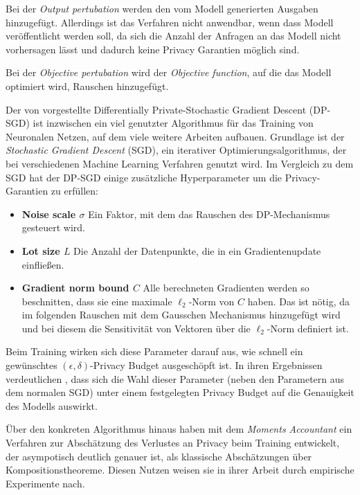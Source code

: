 Bei der \textit{Output pertubation} werden den vom Modell generierten Ausgaben hinzugefügt. Allerdings ist das Verfahren nicht anwendbar, wenn dass Modell veröffentlicht werden soll, da sich die Anzahl der Anfragen an das Modell nicht vorhersagen lässt und dadurch keine Privacy Garantien möglich sind.

Bei der \textit{Objective pertubation} wird der \textit{Objective function}, auf die das Modell optimiert wird, Rauschen hinzugefügt.

Der von \textcite{abadi:2016} vorgestellte Differentially Private-Stochastic Gradient Descent (DP-SGD) ist inzwischen ein viel genutzter Algorithmus für das Training von Neuronalen Netzen, auf dem viele weitere Arbeiten aufbauen. Grundlage ist der \textit{Stochastic Gradient Descent} (SGD), ein iterativer Optimierungsalgorithmus, der bei verschiedenen Machine Learning Verfahren genutzt wird. Im Vergleich zu dem SGD hat der DP-SGD einige zusätzliche Hyperparameter um die Privacy-Garantien zu erfüllen:

\begin{itemize}
  \item \textbf{Noise scale $\sigma$} Ein Faktor, mit dem das Rauschen des DP-Mechanismus gesteuert wird. 
  \item \textbf{Lot size $L$} Die Anzahl der Datenpunkte, die in ein Gradientenupdate einfließen.
  \item \textbf{Gradient norm bound $C$} Alle berechneten Gradienten werden so beschnitten, dass sie eine maximale $\ell_2$-Norm von $C$ haben. Das ist nötig, da im folgenden Rauschen mit dem Gausschen Mechanismus hinzugefügt wird und bei diesem die Sensitivität von Vektoren über die $\ell_2$-Norm definiert ist. 
\end{itemize}

Beim Training wirken sich diese Parameter darauf aus, wie schnell ein gewünschtes $(\epsilon, \delta)$-Privacy Budget ausgeschöpft ist. In ihren Ergebnissen verdeutlichen \textcite{abadi:2016}, dass sich die Wahl dieser Parameter (neben den Parametern aus dem normalen SGD) unter einem festgelegten Privacy Budget auf die Genauigkeit des Modells auswirkt.

Über den konkreten Algorithmus hinaus haben \textcite{abadi:2016} mit dem \textit{Moments Accountant} ein Verfahren zur Abschätzung des Verlustes an Privacy beim Training entwickelt, der asympotisch deutlich genauer ist, als klassische Abschätzungen über Kompositionstheoreme. Diesen Nutzen weisen sie in ihrer Arbeit durch empirische Experimente nach.

